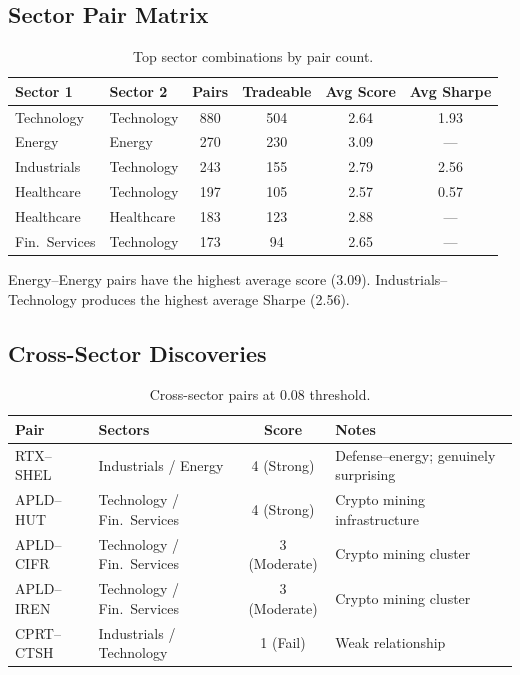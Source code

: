 \documentclass[11pt, a4paper]{article}
\begin{document}
\subsection{Sector Pair Matrix}

\begin{table}[H]
\centering
\caption{Top sector combinations by pair count.}
\small
\begin{tabular}{@{}llcccc@{}}
\toprule
\textbf{Sector 1} & \textbf{Sector 2} & \textbf{Pairs} & \textbf{Tradeable} & \textbf{Avg Score} & \textbf{Avg Sharpe} \\
\midrule
Technology    & Technology    & 880 & 504 & 2.64 & 1.93 \\
Energy        & Energy        & 270 & 230 & 3.09 & ---  \\
Industrials   & Technology    & 243 & 155 & 2.79 & 2.56 \\
Healthcare    & Technology    & 197 & 105 & 2.57 & 0.57 \\
Healthcare    & Healthcare    & 183 & 123 & 2.88 & ---  \\
Fin.\ Services & Technology  & 173 & 94  & 2.65 & ---  \\
\bottomrule
\end{tabular}
\label{tab:sector-matrix}
\end{table}

Energy--Energy pairs have the highest average score (3.09). Industrials--Technology produces the highest average Sharpe (2.56).

\subsection{Cross-Sector Discoveries}

\begin{table}[H]
\centering
\caption{Cross-sector pairs at 0.08 threshold.}
\begin{tabular}{@{}llcl@{}}
\toprule
\textbf{Pair} & \textbf{Sectors} & \textbf{Score} & \textbf{Notes} \\
\midrule
RTX--SHEL   & Industrials / Energy       & 4 (Strong)   & Defense--energy; genuinely surprising \\
APLD--HUT   & Technology / Fin.\ Services & 4 (Strong)   & Crypto mining infrastructure \\
APLD--CIFR  & Technology / Fin.\ Services & 3 (Moderate) & Crypto mining cluster \\
APLD--IREN  & Technology / Fin.\ Services & 3 (Moderate) & Crypto mining cluster \\
CPRT--CTSH  & Industrials / Technology   & 1 (Fail)     & Weak relationship \\
\bottomrule
\end{tabular}
\label{tab:cross-sector}
\end{table}
\end{document}
